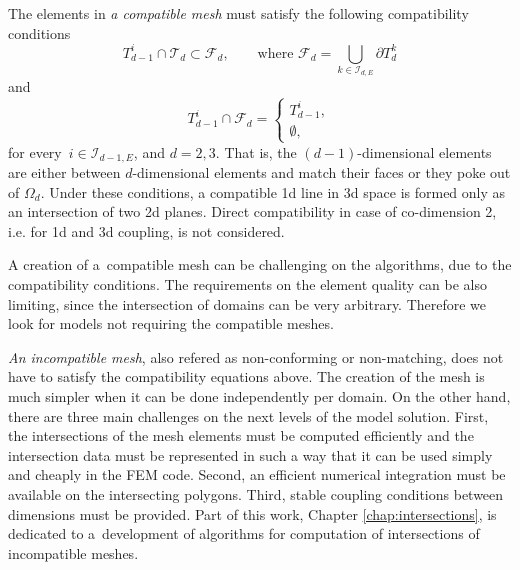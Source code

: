 The elements in \emph{a compatible mesh} must satisfy the following compatibility conditions
\begin{equation}
        T_{d-1}^i \cap \mathcal{T}_d \subset \mathcal{F}_d,  \qquad \text{where } \mathcal{F}_d = \bigcup_{k\in\mathcal{I}_{d,E}} \partial T_{d}^{k}
\end{equation}
and
\begin{equation}
        T_{d-1}^i \cap \mathcal{F}_d = 
        \begin{cases}
            T_{d-1}^i, \\
            \emptyset,
        \end{cases}
\end{equation}
for every $\,i\in\mathcal{I}_{d-1,E}$, and $d=2,3$. 
That is, the $(d-1)$-dimensional elements are either between $d$-dimensional elements and
match their faces or they poke out of $\Omega_d$. 
Under these conditions, a compatible 1d line in 3d space is formed only as an intersection of 
two 2d planes.
Direct compatibility in case of co-dimension 2, i.e. for 1d and 3d coupling, is not considered.


A creation of a~compatible mesh can be challenging on the algorithms, due to the compatibility conditions.
The requirements on the element quality can be also limiting, since the intersection of domains can be very arbitrary.
Therefore we look for models not requiring the compatible meshes.

\emph{An incompatible mesh}, also refered as non-conforming or non-matching, does not have to satisfy the compatibility equations above.
The creation of the mesh is much simpler when it can be done independently per domain.
On the other hand, there are three main challenges on the next levels of the model solution.
First, the intersections of the mesh elements must be computed efficiently and the intersection data
must be represented in such a way that it can be used simply and cheaply in the FEM code.
Second, an efficient numerical integration must be available on the intersecting polygons.
Third, stable coupling conditions between dimensions must be provided.
Part of this work, Chapter \ref{chap:intersections}, is dedicated to a~development of algorithms
for computation of intersections of incompatible meshes.








